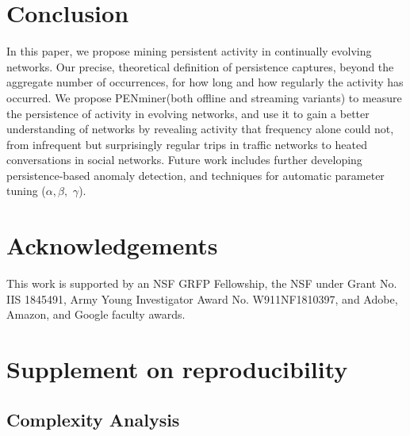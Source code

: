\documentclass[sigconf]{acmart}
\newcommand{\method}{PENminer\xspace}
\newcommand{\wExp}{\alpha}
\newcommand{\fExp}{\beta}
\newcommand{\sExp}{\gamma}
\begin{document}
\section{Conclusion}
\label{sec:conclusion}
In this paper, we propose mining persistent activity in continually evolving networks. Our precise, theoretical definition of persistence captures, beyond the aggregate number of occurrences, for how long and how regularly the activity has occurred. 
We propose \method (both offline and streaming variants) to measure the persistence of activity in evolving networks, and use it to 
gain a better understanding of networks by revealing activity that frequency alone could not, from infrequent but surprisingly regular trips in traffic networks to heated conversations in social networks.
{Future work includes further developing persistence-based anomaly detection, and techniques for automatic parameter tuning ($\wExp, \fExp,$ $\sExp$).}



\section*{Acknowledgements}
{
{This work is supported by}
an NSF GRFP 
Fellowship, 
the NSF under Grant No. IIS 1845491, Army Young Investigator Award No. W911NF1810397, 
and Adobe, Amazon, and Google faculty awards.
}




\appendix
\clearpage
\section{Supplement on reproducibility}
\subsection{Complexity Analysis}
\end{document}
